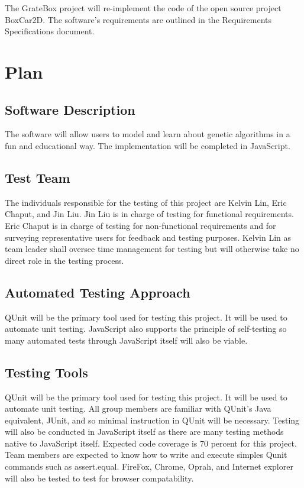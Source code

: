 \documentclass[12pt, titlepage]{article}
\begin{document}
The GrateBox project will re-implement the code of the open source project 
BoxCar2D. The software's requirements are outlined in the Requirements 
Specifications document.

\section{Plan}
	
\subsection{Software Description}

The software will allow users to model and learn about genetic algorithms in a 
fun and educational way. The implementation will be completed in JavaScript.

\subsection{Test Team}

The individuals responsible for the testing of this project are  Kelvin Lin, 
Eric Chaput, and  Jin Liu. Jin Liu is in charge of testing for functional 
requirements. Eric Chaput is in charge of testing for non-functional 
requirements and for surveying representative users for feedback and testing 
purposes. Kelvin Lin as team leader shall oversee time management for testing 
but will otherwise take no direct role in the testing process.

\subsection{Automated Testing Approach}

QUnit will be the primary tool used for testing this project. It will be used to 
automate unit testing. JavaScript also supports the principle of self-testing so 
many automated tests through JavaScript itself will also be viable.

\subsection{Testing Tools}

QUnit will be the primary tool used for testing this project. It will be used to 
automate unit testing. All group members are familiar with QUnit's Java 
equivalent, JUnit, and so minimal instruction in QUnit will be necessary. 
Testing will also be conducted in JavaScript itself as there are many testing 
methods native to JavaScript itself. Expected code coverage is 70 percent for 
this project. Team members are expected to know how to write and execute simples 
Qunit commands such as assert.equal. FireFox, Chrome, Oprah, and Internet 
explorer will also be tested to test for browser compatability.
\end{document}
